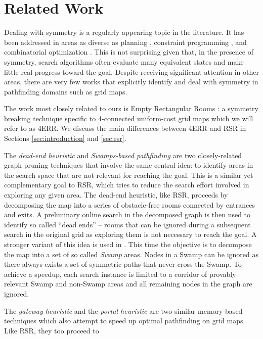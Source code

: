 \section{Related Work}
\label{sec:relatedwork}
Dealing with symmetry is a regularly appearing topic in the literature.  It has
been addressed in areas as diverse as planning \cite{fox99}, constraint programming
\cite{gent00}, and combinatorial optimization \cite{fukunaga08}.  This is not
surprising given that, in the presence of symmetry, search algorithms often
evaluate many equivalent states and make little real progress toward the goal.
Despite receiving significant attention in other areas, there are very few
works that explicitly identify and deal with symmetry in pathfinding domains 
such as grid maps. 
\par
The work most closely related to ours is Empty Rectangular Rooms
\cite{harabor10}: a symmetry breaking technique specific to 4-connected
uniform-cost grid maps which we will refer to as 4ERR.  We discuss the main
differences between 4ERR and RSR in Sections \ref{sec:introduction} and
\ref{sec:rsr}.
\par
The \emph{dead-end heuristic} \cite{bjornsson06} and \emph{Swamps-based
pathfinding} \cite{pochter10} are two closely-related graph pruning techniques
that involve the same central idea: to identify areas in the search space that
are not relevant for reaching the goal. This is a similar yet complementary goal
to RSR, which tries to reduce the search effort involved in exploring any given
area.  The dead-end heuristic, like RSR, proceeds by decomposing the map into a
series of obstacle-free rooms connected by entrances and exits.  A preliminary
online search in the decomposed graph is then used to identify so called ``dead
ends'' -- rooms that can be ignored during a subsequent search in the original
grid as exploring them is not necessary to reach the goal.  A stronger variant
of this idea is used in \cite{pochter10}.
This time the objective is to decompose the map into a set of so 
called \emph{Swamp} areas. Nodes in a Swamp can be ignored as there always
exists a set of symmetric paths that never cross the Swamp.  To achieve a
speedup, each search instance is limited to a corridor of provably relevant
Swamp and non-Swamp areas and all remaining nodes in the graph are ignored.
\par
The \emph{gateway heuristic} \cite{bjornsson06} and the \emph{portal heuristic}
\cite{goldenberg10} are two similar memory-based techniques which also attempt
to speed up optimal pathfinding on grid maps.  Like RSR, they too proceed to
